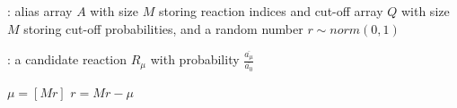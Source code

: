 \begin{algorithm}[H]
\DontPrintSemicolon
{}

\caption{\protect{}}
\label{algo:search-alias-tables}

\Input: alias array $A$ with size $M$ storing reaction indices and cut-off array $Q$ with size $M$ storing cut-off probabilities, and a random number $r\sim norm(0,1)$\;

\Output: a candidate reaction $R_\mu$ with probability $\frac{\overline{a_\mu}}{\overline{a_0}}$\;

$\mu = [Mr]$\;
$r = Mr-\mu$\;

\end{algorithm}
